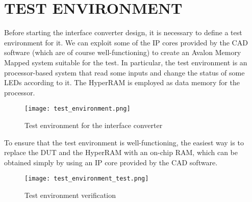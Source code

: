 \documentclass[10pt, english, a4paper, titlepage, oneside]{book}
\begin{document}
\chapter{TEST ENVIRONMENT}
\noindent Before starting the interface converter design, it is necessary to define a test environment for it. We can exploit some of the IP cores provided by the CAD software (which are of course well-functioning) to create an Avalon Memory Mapped system suitable for the test. In particular, the test environment is an processor-based system that read some inputs and change the status of some LEDs according to it. The HyperRAM is employed as data memory for the processor.
\vspace{6mm}
\begin{figure}[H]
    \centering
    \texttt{[image: test\_environment.png]}
    \vspace{3mm}
    \caption{Test environment for the interface converter}
    \label{test_environment}
\end{figure}
\vspace{6mm}
\noindent To ensure that the test environment is well-functioning, the easiest way is to replace the DUT and the HyperRAM with an on-chip RAM, which can be obtained simply by using an IP core provided by the CAD software.
\vspace{6mm}
\begin{figure}[H]
    \centering
    \texttt{[image: test\_environment\_test.png]}
    \vspace{3mm}
    \caption{Test environment verification}
    \label{test_environment_test}
\end{figure}

\end{document}
